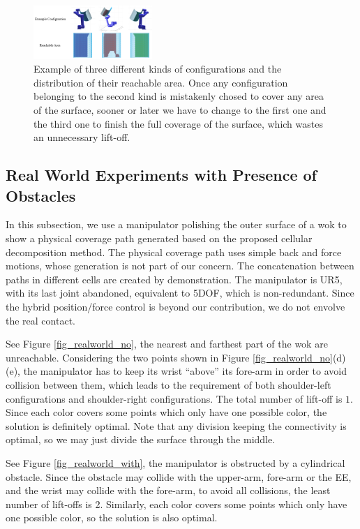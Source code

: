 \documentclass[journal]{IEEEtran}
\begin{document}
\begin{figure}[htb]
\centering
\includegraphics[width = 0.4\textwidth]{exp_pipe/three_example_pose}
\caption{Example of three different kinds of configurations and the distribution of their reachable area. Once any configuration belonging to the second kind is mistakenly chosed to cover any area of the surface, sooner or later we have to change to the first one and the third one to finish the full coverage of the surface, which wastes an unnecessary lift-off.}\label{figthreeexamplepose}
\end{figure}

\subsection{Real World Experiments with Presence of Obstacles}

In this subsection, we use a manipulator polishing the outer surface of a wok to show a physical coverage path generated based on the proposed cellular decomposition method. 
The physical coverage path uses simple back and force motions, whose generation is not part of our concern. The concatenation between paths in different cells are created by demonstration. 
The manipulator is UR5, with its last joint abandoned, equivalent to 5DOF, which is non-redundant. 
Since the hybrid position/force control is beyond our contribution, we do not envolve the real contact. 

See Figure \ref{fig_realworld_no}, the nearest and farthest part of the wok are unreachable. 
Considering the two points shown in Figure \ref{fig_realworld_no}(d)(e), the manipulator has to keep its wrist ``above'' its fore-arm in order to avoid collision between them, which leads to the requirement of both shoulder-left configurations and shoulder-right configurations. 
The total number of lift-off is $1$. Since each color covers some points which only have one possible color, the solution is definitely optimal. Note that any division keeping the connectivity is optimal, so we may just divide the surface through the middle. 

See Figure \ref{fig_realworld_with}, the manipulator is obstructed by a cylindrical obstacle. Since the obstacle may collide with the upper-arm, fore-arm or the EE, and the wrist may collide with the fore-arm, to avoid all collisions, the least number of lift-offs is 2. Similarly, each color covers some points which only have one possible color, so the solution is also optimal. 
\end{document}
